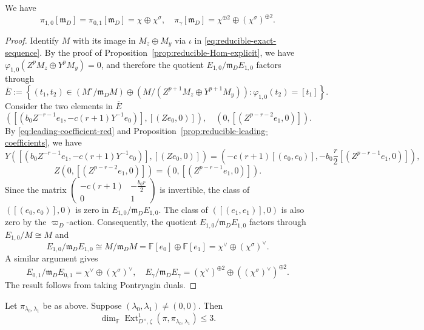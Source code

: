 \documentclass[11pt,a4paper]{article} %
\def\FF{\mathbb{F}}
\def\dim{\operatorname{dim}}
\def\Ext{\operatorname{Ext}} %
\begin{document}
\begin{proposition}
    We have
    \[
    \pi_{1,0}[\mathfrak m_D]=\pi_{0,1}[\mathfrak m_D]=\chi\oplus\chi^\sigma,\quad\pi_\gamma[\mathfrak m_D]
    =\chi^{\oplus2}\oplus(\chi^\sigma)^{\oplus2}.
    \]
\end{proposition}

\begin{proof}
    Identify $M$ with its image in $M_z\oplus M_y$
    via $\iota$ in \eqref{eq:reducible-exact-sequence}.
    By the proof of Proposition~\ref{prop:reducible-Hom-explicit},
    we have $\varphi_{1,0}(Z^pM_z\oplus Y^pM_y)=0$, and therefore the quotient $E_{1,0}/\mathfrak m_DE_{1,0}$ factors through
    \[
    \overline{E}:=
    \left\{
    (t_1,t_2)\in
    (M^\circ/\mathfrak m_DM)
    \oplus
    \left(M/(Z^{p+1}M_z\oplus Y^{p+1}M_y)\right):
    \varphi_{1,0}(t_2)=[t_1]
    \right\}.
    \]
    Consider the two elements in $\overline{E}$
    \[
    \left(\left[\left(b_0Z^{-r-1}e_1,-c(r+1)Y^{-1}e_0\right)\right],[(Ze_0,0)]\right),\quad\left(0,[(Z^{p-r-2}e_1,0)]\right).
    \]
    By \eqref{eq:leading-coefficient-red} and
    Proposition~\ref{prop:reducible-leading-coefficients},
    we have
    \[
    Y\left(\left[\left(b_0Z^{-r-1}e_1,-c(r+1)Y^{-1}e_0\right)\right],[(Ze_0,0)]\right)=\left(-c(r+1)[(e_0,e_0)],-b_0\frac{r}{2}[(Z^{p-r-1}e_1,0)]\right),
    \]
    \[
    Z\left(0,[(Z^{p-r-2}e_1,0)]\right)
    =
    \left(0,[(Z^{p-r-1}e_1,0)]\right).
    \]
    Since the matrix $
    \begin{pmatrix}
    -c(r+1)&-\frac{b_0r}{2}\\
    0&1
    \end{pmatrix}$
    is invertible, the class of
    $\left([(e_0,e_0)],0\right)$ is zero in
    $E_{1,0}/\mathfrak{m}_DE_{1,0}$.
    The class of $\left([(e_1,e_1)],0\right)$ is also zero by the $\varpi_D$-action. Consequently, the quotient $E_{1,0}/\mathfrak m_DE_{1,0}$ factors through $E_{1,0}/M\cong M$ and
    \[
    E_{1,0}/\mathfrak{m}_DE_{1,0}\cong M/\mathfrak{m}_DM=\FF[e_0]\oplus\FF[e_1]=\chi^\vee\oplus(\chi^\sigma)^\vee.
    \]
    A similar argument gives
    \[
    E_{0,1}/\mathfrak{m}_DE_{0,1}=\chi^\vee\oplus(\chi^\sigma)^\vee,\quad E_\gamma/\mathfrak{m}_DE_\gamma=(\chi^\vee)^{\oplus2}
    \oplus\left((\chi^\sigma)^\vee\right)^{\oplus2}.
    \]
    The result follows from taking Pontryagin duals.
\end{proof}

\begin{proposition}\label{prop:reducible-application}
    Let $\pi_{\lambda_0,\lambda_1}$ be as above. Suppose $(\lambda_0,\lambda_1)\ne(0,0)$. Then
    \[
    \dim_\FF\Ext^1_{D^\times,\zeta}(\pi,\pi_{\lambda_0,\lambda_1})\le3.
    \]
\end{proposition}
\end{document}
